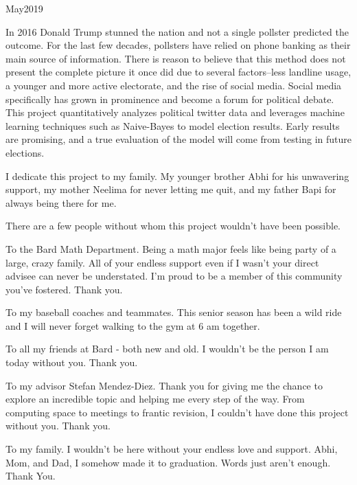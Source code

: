\documentclass[11pt, twoside, reqno]{book}
\begin{document}
    {May}{2019}

\abstr

In 2016 Donald Trump stunned the nation and not a single pollster predicted the outcome. For the last few decades, pollsters have relied on phone banking as their main source of information. There is reason to believe that this method does not present the complete picture it once did due to several factors--less landline usage, a younger and more active electorate, and the rise of social media. Social media specifically has grown in prominence and become a forum for political debate. This project quantitatively analyzes political twitter data and leverages machine learning techniques such as Naive-Bayes to model election results. Early results are promising, and a true evaluation of the model will come from testing in future elections. 

\tableofcontents

\dedic

I dedicate this project to my family. My younger brother Abhi for his unwavering support, my mother Neelima for never letting me quit, and my father Bapi for always being there for me. 

\acknowl

There are a few people without whom this project wouldn't have been possible. 
\newline

To the Bard Math Department. Being a math major feels like being party of a large, crazy family. All of your endless support even if I wasn't your direct advisee can never be understated. I'm proud to be a member of this community you've fostered. Thank you. 
\newline

To my baseball coaches and teammates. This senior season has been a wild ride and I will never forget walking to the gym at 6 am together. 
\newline

To all my friends at Bard - both new and old. I wouldn't be the person I am today without you. Thank you. 

To my advisor Stefan Mendez-Diez. Thank you for giving me the chance to explore an incredible topic and helping me every step of the way. From computing space to meetings to frantic revision, I couldn't have done this project without you. Thank you. 
\newline

To my family. I wouldn't be here without your endless love and support. Abhi, Mom, and Dad, I somehow made it to graduation. Words just aren't enough. Thank You.  
\end{document}
